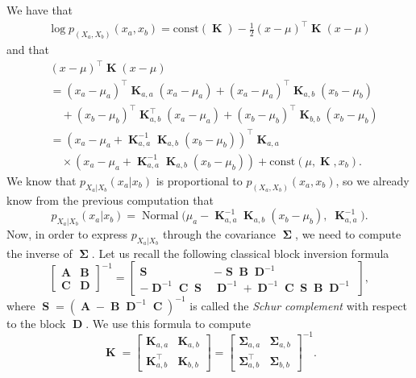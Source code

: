 \documentclass[
	fontsize=11pt, %
	twoside=false, %
	numbers=noenddot, %
]{kaobook}
\DeclareMathOperator{\bA}{{\boldsymbol A}}
\DeclareMathOperator{\bB}{{\boldsymbol B}}
\DeclareMathOperator{\bC}{{\boldsymbol C}}
\DeclareMathOperator{\bD}{{\boldsymbol D}}
\DeclareMathOperator{\bK}{{\boldsymbol K}}
\DeclareMathOperator{\bS}{{\boldsymbol S}}
\DeclareMathOperator{\bSigma}{\boldsymbol \Sigma}
\DeclareMathOperator{\nor}{Normal}
\begin{document}
We have that
\begin{align*}
	\log p_{(X_a, X_b)}(x_a, x_b) = \text{const}(\bK) - \frac 12 (x - \mu)^\top \bK (x - \mu)
\end{align*}
and that
\begin{align*}
	&(x - \mu)^\top \bK (x - \mu) \\
	&= (x_a - \mu_a)^\top \bK_{a,a} (x_a - \mu_a) + (x_a - \mu_a)^\top \bK_{a, b} (x_b - \mu_b) \\
	&\quad + (x_b - \mu_b)^\top \bK_{a,b}^\top (x_a - \mu_a) + (x_b - \mu_b)^\top \bK_{b,b} (x_b - \mu_b) \\
	&= (x_a - \mu_a + \bK_{a,a}^{-1} \bK_{a,b} (x_b - \mu_b))^\top \bK_{a, a} \\
	& \quad \times (x_a - \mu_a + \bK_{a,a}^{-1} \bK_{a,b} (x_b - \mu_b)) + \text{const}(\mu, \bK, x_b).
\end{align*}
We know that $p_{X_a | X_b}(x_a | x_b)$ is proportional to $p_{(X_a, X_b)}(x_a, x_b)$, so we already know from the previous computation that
\begin{equation*}
	p_{X_a | X_b}(x_a | x_b) = 
	\nor \Big( \mu_a - \bK_{a, a}^{-1} \bK_{a, b} (x_b - \mu_b), 
	\; \bK_{a, a}^{-1} \Big).
\end{equation*}
Now, in order to express $p_{X_a | X_b}$ through the covariance $\bSigma$, we need to compute the inverse of $\bSigma$.
Let us recall the following classical block inversion formula
\begin{equation*}
	\begin{bmatrix}
	\bA & \bB \\
	\bC & \bD		
	\end{bmatrix}^{-1}
	=
	\begin{bmatrix}
		\bS & - \bS \bB \bD^{-1} \\
		- \bD^{-1} \bC \bS & \bD^{-1} + \bD^{-1} \bC \bS \bB \bD^{-1}
	\end{bmatrix},
\end{equation*}
where $\bS = (\bA - \bB \bD^{-1} \bC)^{-1}$ is called the \emph{Schur complement} with respect to the block $\bD$.
We use this formula to compute
\begin{equation*}
	\bK = 
	\begin{bmatrix}
		\bK_{a, a} & \bK_{a, b} \\
		\bK_{a, b}^\top & \bK_{b, b}
	\end{bmatrix}
	= 
	\begin{bmatrix}
		\bSigma_{a, a} & \bSigma_{a, b} \\
		\bSigma_{a, b}^\top & \bSigma_{b, b}
	\end{bmatrix}^{-1}.
\end{equation*}
\end{document}
